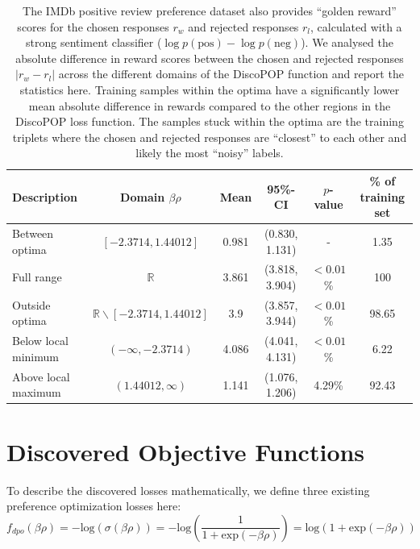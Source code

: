 \documentclass{article}
\theoremstyle{plain}
\theoremstyle{definition}
\theoremstyle{remark}
\begin{document}
\begin{table}[h!]
    \small
    \centering
    \begin{tabular}{lccccc}
       \textbf{Description} & \textbf{Domain $\beta\rho$} & \textbf{Mean} & \textbf{95\%-CI}&\textbf{$p$-value} & \textbf{\% of training set}\\
       \toprule
        Between optima & $[-2.3714, 1.44012]$ & 0.981 & (0.830, 1.131) & - & 1.35\\
        \midrule
        Full range& $\mathbb{R}$& 3.861 & (3.818, 3.904) & $< 0.01$\% &100\\
        Outside optima & $\mathbb{R} \backslash [-2.3714, 1.44012] $& 3.9 & (3.857, 3.944) & $< 0.01$\% & 98.65\\
        Below local minimum& $(-\infty, -2.3714)$ & 4.086 & (4.041, 4.131) & $< 0.01$\% &6.22\\
        Above local maximum& $(1.44012, \infty)$ & 1.141 & (1.076, 1.206) &4.29\% &92.43\\
        \bottomrule
    \end{tabular}
    \caption{The IMDb positive review preference dataset also provides ``golden reward'' scores for the chosen responses $r_w$ and rejected responses $r_l$, calculated with a strong sentiment classifier ($\log p(\text{pos}) - \log p(\text{neg})$). We analysed the absolute difference in reward scores between the chosen and rejected responses $|r_w - r_l|$ across the different domains of the DiscoPOP function and report the statistics here. Training samples within the optima have a significantly lower mean absolute difference in rewards compared to the other regions in the DiscoPOP loss function. The samples stuck within the optima are the training triplets where the chosen and rejected responses are ``closest'' to each other and likely the most ``noisy'' labels.}
    \label{tab:abs_reward_differences}
\end{table}

\section{Discovered Objective Functions}
\label{DiscoveredObjectivefFunctions}

To describe the discovered losses mathematically, we define three existing preference optimization losses here:
\begin{equation}
    f_{dpo}(\beta\rho) =  -\text{log}(\sigma(\beta\rho)) = -\text{log}(\frac{1}{1+\text{exp}(-\beta\rho)})  = \text{log}(1+\text{exp}(-\beta\rho))
\end{equation}
\end{document}
